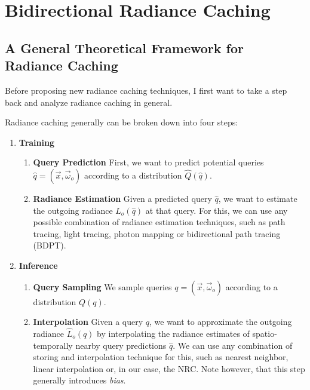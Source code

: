 
\chapter{Bidirectional Radiance Caching}
\label{chap:bidirectional_caching}

\section{A General Theoretical Framework for Radiance Caching}
Before proposing new radiance caching techniques, I first want to take a step back and analyze radiance caching in general.

Radiance caching generally can be broken down into four steps:

\begin{enumerate}
    \item \textbf{Training}
    \begin{enumerate}
        \item \textbf{Query Prediction} First, we want to predict potential queries $\hat{q} = (\vec{x}, \vec{\omega}_o)$ according to a distribution $\hat{Q}(\hat{q})$.
        \item \textbf{Radiance Estimation} Given a predicted query $\hat{q}$, we want to estimate the outgoing radiance $L_o(\hat{q})$ at that query.
        For this, we can use any possible combination of radiance estimation techniques, such as path tracing, light tracing, photon mapping or bidirectional path tracing (BDPT).
    \end{enumerate}
    \item \textbf{Inference}
    \begin{enumerate}
        \item \textbf{Query Sampling} We sample queries $q = (\vec{x}, \vec{\omega}_o)$ according to a distribution $Q(q)$.
        \item \textbf{Interpolation} Given a query $q$, we want to approximate the outgoing radiance $\hat{L}_o(q)$ by interpolating the radiance estimates of spatio-temporally nearby query predictions $\hat{q}$.
        We can use any combination of storing and interpolation technique for this, such as nearest neighbor, linear interpolation or, in our case, the NRC.
        Note however, that this step generally introduces \emph{bias}.
    \end{enumerate}
\end{enumerate}

